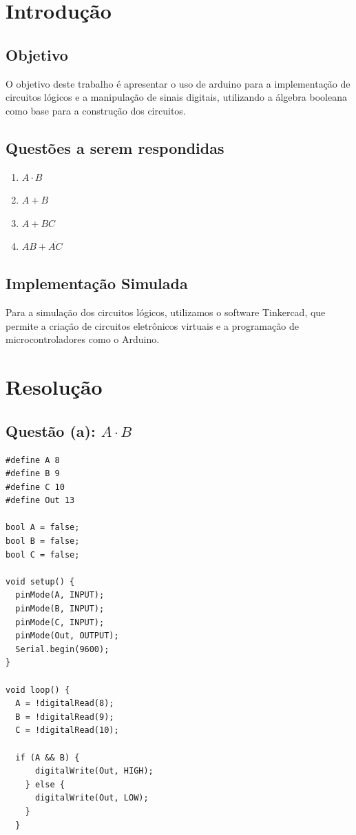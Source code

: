 \documentclass[12pt, a4paper]{article}
\begin{document}
\section{Introdução}
\subsection{Objetivo}
O objetivo deste trabalho é apresentar o uso de arduino para a implementação de circuitos lógicos
e a manipulação de sinais digitais, utilizando a álgebra booleana como base para a construção dos circuitos.

\subsection{Questões a serem respondidas}
\begin{enumerate}[label=(\alph*)]
	\item $A \cdot B$
	\item $A + B$
	\item $A + BC$
	\item $AB + \overline{AC}$
\end{enumerate}

\subsection{Implementação Simulada}
Para a simulação dos circuitos lógicos, utilizamos o software Tinkercad, que permite a criação de circuitos eletrônicos virtuais e a programação de microcontroladores como o Arduino.
\newpage

\section{Resolução}
\subsection{
	Questão (a): $A \cdot B$
}
\begin{verbatim}
#define A 8
#define B 9
#define C 10
#define Out 13

bool A = false;
bool B = false;
bool C = false;

void setup() {
  pinMode(A, INPUT);
  pinMode(B, INPUT);
  pinMode(C, INPUT);
  pinMode(Out, OUTPUT);
  Serial.begin(9600);
}

void loop() {
  A = !digitalRead(8);
  B = !digitalRead(9);
  C = !digitalRead(10);

  if (A && B) {
      digitalWrite(Out, HIGH);
    } else {
      digitalWrite(Out, LOW);
    }
  }
\end{verbatim}
\end{document}
